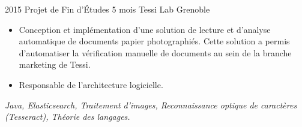 \cventry
    {2015}
    {Projet de Fin d'Études}
    {5 mois}
    {Tessi Lab}
    {Grenoble}
    {
        \begin{itemize}
            \item Conception et implémentation d'une solution de lecture et d'analyse automatique de documents papier photographiés. Cette solution a permis d'automatiser la vérification manuelle de documents au sein de la branche marketing de Tessi.
            \item Responsable de l'architecture logicielle.
        \end{itemize}
        \vspace*{1mm}
        \textit{Java, Elasticsearch, Traitement d'images, Reconnaissance optique de caractères (Tesseract), Théorie des langages.}
    }
\vspace*{0.2cm}